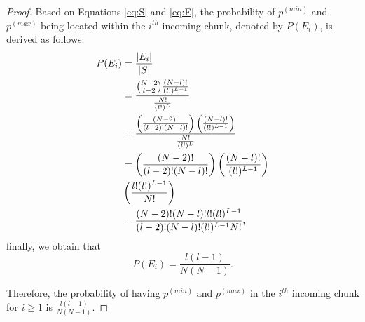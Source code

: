 \documentclass[a4paper,fleqn]{cas-dc}
\begin{document}
\begin{theorem}
\begin{proof}
Based on Equations \ref{eq:S} and \ref{eq:E}, the probability of $p^{(min)}$ and $p^{(max)}$ being located within the $i^{th}$ incoming chunk, denoted by $P(E_i)$, is derived as follows:
\begin{align*}
    P(E_i) &= \frac{|E_i|}{|S|}    \notag\\
           &= \frac{\binom{N-2}{l-2}\frac{(N-l)!}{(l!)^{L-1}}}{\frac{N!}{(l!)^L}}\\
           &= \frac{\left(\frac{(N-2)!}{(l-2)!(N-l)!} \right)\left( \frac{(N-l)!}{(l!)^{L-1}}\right)}{\frac{N!}{(l!)^L}} \\
           &= \left(\frac{(N-2)!}{(l-2)!(N-l)!} \right)\left( \frac{(N-l)!}{(l!)^{L-1}}\right)\\
           &\left(\frac{l!(l!)^{L-1}}{N!}\right) \\
           &=\frac{(N-2)!(N-l)!l!(l!)^{L-1}}{(l-2)!(N-l)!(l!)^{L-1}N!},      \\
\end{align*}
finally, we obtain that
\begin{equation}
P(E_i) =\frac{l(l-1)}{N(N-1)}.
\end{equation}

Therefore, the probability of having $p^{(min)}$ and $p^{(max)}$ in the $i^{th}$ incoming chunk  for $i \geq 1$ is 
$\frac{l(l-1)}{N(N-1)}$.



 
\end{proof} 
\end{theorem}

\newtheorem{corollary}{Corollary}
\end{document}
